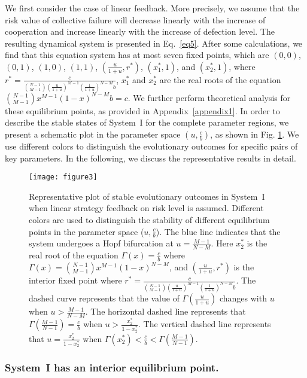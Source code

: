\documentclass[9pt]{elife}
\begin{document}
We first consider the case of linear feedback. More precisely, we assume that the risk value of collective failure will decrease linearly with the increase of cooperation and increase linearly with the increase of defection level. The resulting dynamical system is presented in Eq.~\eqref{eq5}. After some calculations, we find that this equation system has at most seven fixed points, which are $(0, 0)$, $(0, 1)$, $(1 ,0)$, $(1, 1)$, $(\frac{u}{1+u}, r^{*})$, $(x_{1}^{*},1)$, and $(x_{2}^{*},1)$, where $r^{*}= \frac{c}{\binom{N-1}{M-1}(\frac{u}{1+u})^{M-1}(\frac{1}{1+u})^{N-M} b}$, $x_{1}^{*}$ and $x_{2}^{*}$  are the real roots of the equation $\binom{N-1}{M-1}x^{M-1}(1-x)^{N-M} b=c$. We further perform theoretical analysis for these equilibrium points, as provided in Appendix~\ref{appendix1}. In order to describe the stable states of System~I for the complete parameter regions, we present a schematic plot in the parameter space $(u, \frac{c}{b})$, as shown in Fig. \ref{fig3}. We use different colors to distinguish the evolutionary outcomes for specific pairs of key parameters. In the following, we discuss the representative results in detail.

\begin{figure}
\texttt{[image: figure3]}
\caption{Representative plot of stable evolutionary outcomes in System~I when linear strategy feedback on risk level is assumed.
Different colors are used to distinguish the stability of different equilibrium points in the parameter space ($u, \frac{c}{b}$). The blue line indicates that the system undergoes a Hopf bifurcation at $u=\frac{M-1}{N-M}$. Here $x_{2}^{*}$ is the real root of the equation $\Gamma(x) =\frac{c}{b}$ where $\Gamma(x)=\binom{N-1}{M-1}x^{M-1}(1-x)^{N-M}$, and $(\frac{u}{1+u}, r^{*})$ is the interior fixed point where $r^{*}=\frac{c}{\binom{N-1}{M-1}(\frac{u}{1+u})^{M-1}(\frac{1}{1+u})^{N-M} b}$. The dashed curve represents that the value of $\Gamma(\frac{u}{1+u})$ changes with $u$ when $u>\frac{M-1}{N-M}$. The horizontal dashed line represents that $\Gamma(\frac{M-1}{N-1})=\frac{c}{b}$ when $u>\frac{x_{2}^{*}}{1-x_{2}^{*}}$. The vertical dashed line represents that $u=\frac{x_{2}^{*}}{1-x_{2}^{*}}$ when $\Gamma(x_{2}^{*})<\frac{c}{b}<\Gamma(\frac{M-1}{N-1})$.}
\label{fig3}
\end{figure}


\subsubsection{System~I has an interior equilibrium point.}
\end{document}
